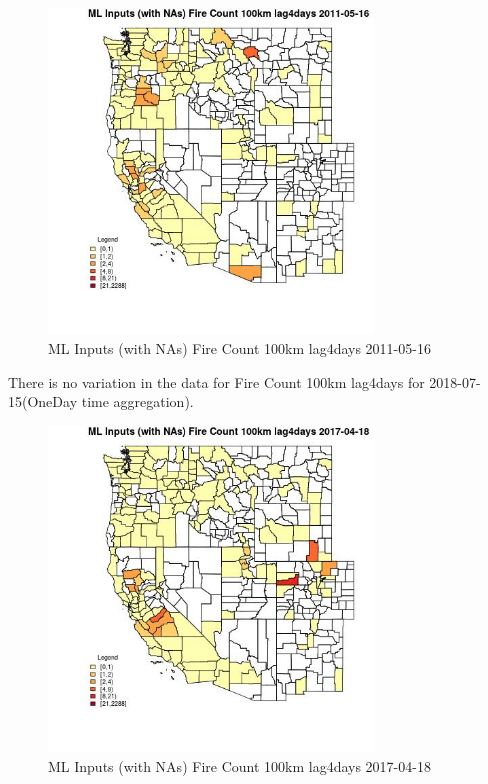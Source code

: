\begin{figure} 
\centering  
\includegraphics[width=0.77\textwidth]{Code_Outputs/Report_ML_input_PM25_Step4_part_e_de_duplicated_aves_compiled_2019-05-21wNAs_CountyFire_Count_100km_lag4daysMean2011-05-16.jpg} 
\caption{\label{fig:Report_ML_input_PM25_Step4_part_e_de_duplicated_aves_compiled_2019-05-21wNAsCountyFire_Count_100km_lag4daysMean2011-05-16}ML Inputs (with NAs) Fire Count 100km lag4days 2011-05-16} 
\end{figure} 
 

There is no variation in the data for Fire Count 100km lag4days for 2018-07-15(OneDay time aggregation). 
 

\begin{figure} 
\centering  
\includegraphics[width=0.77\textwidth]{Code_Outputs/Report_ML_input_PM25_Step4_part_e_de_duplicated_aves_compiled_2019-05-21wNAs_CountyFire_Count_100km_lag4daysMean2017-04-18.jpg} 
\caption{\label{fig:Report_ML_input_PM25_Step4_part_e_de_duplicated_aves_compiled_2019-05-21wNAsCountyFire_Count_100km_lag4daysMean2017-04-18}ML Inputs (with NAs) Fire Count 100km lag4days 2017-04-18} 
\end{figure} 
 


